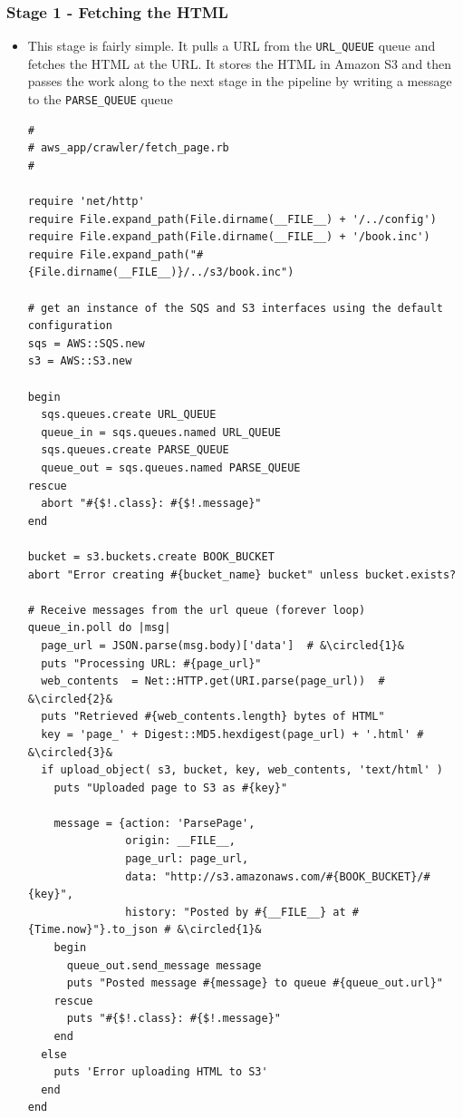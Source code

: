 \documentclass{beamer}
\newcommand*\circled[1]{\tikz[baseline=(char.base)]{
            \node[shape=circle,draw,inner sep=1pt] (char) {#1};}}
\begin{document}
\begin{frame}
\frametitle{Stage 1 - Fetching the HTML}

\begin{itemize}
 \item This stage is fairly simple. It pulls a URL from the \texttt{URL\_QUEUE} queue and fetches the
HTML at the URL. It stores the HTML in Amazon S3 and then passes the work along
to the next stage in the pipeline by writing a message to the \texttt{PARSE\_QUEUE} queue
\lstset{language=Ruby, style=eclipse}
\begin{lstlisting}[escapechar=&]
#
# aws_app/crawler/fetch_page.rb
#

require 'net/http'
require File.expand_path(File.dirname(__FILE__) + '/../config')
require File.expand_path(File.dirname(__FILE__) + '/book.inc')
require File.expand_path("#{File.dirname(__FILE__)}/../s3/book.inc")

# get an instance of the SQS and S3 interfaces using the default configuration
sqs = AWS::SQS.new
s3 = AWS::S3.new

begin
  sqs.queues.create URL_QUEUE
  queue_in = sqs.queues.named URL_QUEUE
  sqs.queues.create PARSE_QUEUE
  queue_out = sqs.queues.named PARSE_QUEUE
rescue
  abort "#{$!.class}: #{$!.message}"
end

bucket = s3.buckets.create BOOK_BUCKET
abort "Error creating #{bucket_name} bucket" unless bucket.exists?

# Receive messages from the url queue (forever loop)
queue_in.poll do |msg|
  page_url = JSON.parse(msg.body)['data']  # &\circled{1}&
  puts "Processing URL: #{page_url}"
  web_contents  = Net::HTTP.get(URI.parse(page_url))  # &\circled{2}&
  puts "Retrieved #{web_contents.length} bytes of HTML"
  key = 'page_' + Digest::MD5.hexdigest(page_url) + '.html' # &\circled{3}&
  if upload_object( s3, bucket, key, web_contents, 'text/html' )
    puts "Uploaded page to S3 as #{key}"

    message = {action: 'ParsePage',
               origin: __FILE__,
               page_url: page_url,
               data: "http://s3.amazonaws.com/#{BOOK_BUCKET}/#{key}",
               history: "Posted by #{__FILE__} at #{Time.now}"}.to_json # &\circled{1}&
    begin
      queue_out.send_message message
      puts "Posted message #{message} to queue #{queue_out.url}"
    rescue
      puts "#{$!.class}: #{$!.message}"
    end
  else
    puts 'Error uploading HTML to S3'
  end
end
\end{lstlisting}


\end{itemize}
\end{frame}
\end{document}
